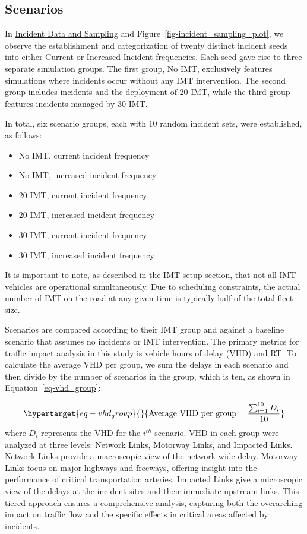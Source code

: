 \documentclass[fancy, oneside, mastersfancy, ms]{byuthesis}
\providecommand{\tightlist}{%
  \setlength{\itemsep}{0pt}\setlength{\parskip}{0pt}}\usepackage{longtable,booktabs,array}
\begin{document}
\hypertarget{sec-scenarios}{%
\subsection{Scenarios}\label{sec-scenarios}}

In \protect\hyperlink{sec-inc_data}{Incident Data and Sampling} and
Figure~\ref{fig-incident_sampling_plot}, we observe the establishment
and categorization of twenty distinct incident seeds into either Current
or Increased Incident frequencies. Each seed gave rise to three separate
simulation groups. The first group, No IMT, exclusively features
simulations where incidents occur without any IMT intervention. The
second group includes incidents and the deployment of 20 IMT, while the
third group features incidents managed by 30 IMT.

In total, six scenario groups, each with 10 random incident sets, were
established, as follows:

\begin{itemize}
\tightlist
\item
  No IMT, current incident frequency
\item
  No IMT, increased incident frequency
\item
  20 IMT, current incident frequency
\item
  20 IMT, increased incident frequency
\item
  30 IMT, current incident frequency
\item
  30 IMT, increased incident frequency
\end{itemize}

It is important to note, as described in the
\protect\hyperlink{sec-IMT_setup}{IMT setup} section, that not all IMT
vehicles are operational simultaneously. Due to scheduling constraints,
the actual number of IMT on the road at any given time is typically half
of the total fleet size.

Scenarios are compared according to their IMT group and against a
baseline scenario that assumes no incidents or IMT intervention. The
primary metrics for traffic impact analysis in this study is vehicle
hours of delay (VHD) and RT. To calculate the average VHD per group, we
sum the delays in each scenario and then divide by the number of
scenarios in the group, which is ten, as shown in
Equation~\ref{eq-vhd_group}:

\begin{equation}\protect\hypertarget{eq-vhd_group}{}{
\text{Average VHD per group} = \frac{\sum_{i=1}^{10} D_i}{10}
}\label{eq-vhd_group}\end{equation} where \(D_i\) represents the VHD for
the \(i^{th}\) scenario. VHD in each group were analyzed at three
levels: Network Links, Motorway Links, and Impacted Links. Network Links
provide a macroscopic view of the network-wide delay. Motorway Links
focus on major highways and freeways, offering insight into the
performance of critical transportation arteries. Impacted Links give a
microscopic view of the delays at the incident sites and their immediate
upstream links. This tiered approach ensures a comprehensive analysis,
capturing both the overarching impact on traffic flow and the specific
effects in critical areas affected by incidents.
\end{document}
